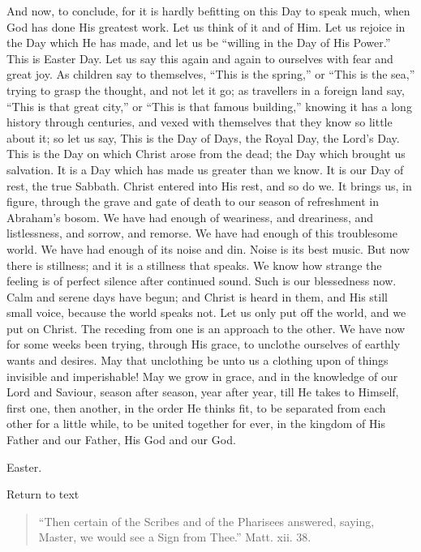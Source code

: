And now, to conclude, for it is hardly befitting on this Day to speak
much, when God has done His greatest work. Let us think of it and of
Him. Let us rejoice in the Day which He has made, and let us be
``willing in the Day of His Power.'' This is Easter Day. Let us
say this again and again to ourselves with fear and great joy. As
children say to themselves, ``This is the spring,'' or
``This is the sea,'' trying to grasp the thought, and not let it
go; as travellers in a foreign land say, ``This is that great
city,'' or ``This is that famous building,'' knowing it has
a long history through centuries, and vexed with themselves that they
know so little about it; so let us say, This is the Day of Days, the
Royal Day, the Lord's Day. This is the Day on which Christ arose from
the dead; the Day which brought us salvation. It is a Day which has made
us greater than we know. It is our Day of rest, the true Sabbath. Christ
entered into His rest, and so do we. It brings us, in figure, through
the grave and gate of death to our season of refreshment in Abraham's
bosom. We have had enough of weariness, and dreariness, and
listlessness, and sorrow, and remorse. We have had enough of this
troublesome world. We have had enough of its noise and din. Noise is its
best music. But now there is stillness; and it is a stillness that
speaks. We know how strange the feeling is of perfect silence after
continued sound. Such is our blessedness now. Calm and serene days have
begun; and Christ is heard in them, and His still small voice, because
the world speaks not. Let us only put off the world, and we put on
Christ. The receding from one is an approach to the other. We have now
for some weeks been trying, through His grace, to unclothe ourselves of
earthly wants and desires. May that unclothing be unto us a clothing
upon of things invisible and imperishable! May we grow in grace, and in
the knowledge of our Lord and Saviour, season after season, year after
year, till He takes to Himself, first one, then another, in the order He
thinks fit, to be separated from each other for a little while, to be
united together for ever, in the kingdom of His Father and our Father,
His God and our God.


Easter.

Return to text


\begin{quote}

``Then certain of the Scribes and of the Pharisees answered,
saying, Master, we would see a Sign from Thee.'' Matt. xii. 38.

\end{quote}

